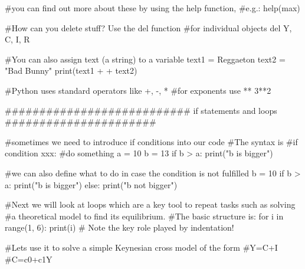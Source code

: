 \documentclass[
  letterpaper,
  DIV=11,
  numbers=noendperiod]{scrreprt}
\newenvironment{Shaded}{\begin{snugshade}}{\end{snugshade}}
\newcommand{\BuiltInTok}[1]{\textcolor[rgb]{0.00,0.23,0.31}{#1}}
\newcommand{\CommentTok}[1]{\textcolor[rgb]{0.37,0.37,0.37}{#1}}
\newcommand{\ControlFlowTok}[1]{\textcolor[rgb]{0.00,0.23,0.31}{#1}}
\newcommand{\DecValTok}[1]{\textcolor[rgb]{0.68,0.00,0.00}{#1}}
\newcommand{\KeywordTok}[1]{\textcolor[rgb]{0.00,0.23,0.31}{#1}}
\newcommand{\NormalTok}[1]{\textcolor[rgb]{0.00,0.23,0.31}{#1}}
\newcommand{\OperatorTok}[1]{\textcolor[rgb]{0.37,0.37,0.37}{#1}}
\newcommand{\StringTok}[1]{\textcolor[rgb]{0.13,0.47,0.30}{#1}}
\begin{document}
\begin{tcolorbox}
\begin{Shaded}
\begin{Highlighting}[]
\CommentTok{\#you can find out more about these by using the help function, }
\CommentTok{\#e.g.: help(max)}

\CommentTok{\#How can you delete stuff? Use the del function}
\CommentTok{\#for individual objects}
\KeywordTok{del}\NormalTok{ Y, C, I, R}

\CommentTok{\#You can also assign text (a string) to a variable}
\NormalTok{text1 }\OperatorTok{=} \StringTok{\textquotesingle{}Reggaeton\textquotesingle{}}
\NormalTok{text2 }\OperatorTok{=} \StringTok{"Bad Bunny"}
\BuiltInTok{print}\NormalTok{(text1 }\OperatorTok{+} \StringTok{\textquotesingle{} \textquotesingle{}} \OperatorTok{+}\NormalTok{ text2)}

\CommentTok{\#Python uses standard operators like +, {-}, *}
\CommentTok{\#for exponents use **}
\DecValTok{3}\OperatorTok{**}\DecValTok{2}

\CommentTok{\#\#\#\#\#\#\#\#\#\#\#\#\#\#\#\#\#\#\#\#\#\#\#\#\#\#\# if statements and loops \#\#\#\#\#\#\#\#\#\#\#\#\#\#\#\#\#\#\#\#\#\#}

\CommentTok{\#sometimes we need to introduce if conditions into our code}
\CommentTok{\#The syntax is}
\CommentTok{\#if condition xxx:}
    \CommentTok{\#do something    }
\NormalTok{a }\OperatorTok{=} \DecValTok{10}
\NormalTok{b }\OperatorTok{=} \DecValTok{13}
\ControlFlowTok{if}\NormalTok{ b }\OperatorTok{\textgreater{}}\NormalTok{ a:}
    \BuiltInTok{print}\NormalTok{(}\StringTok{"b is bigger"}\NormalTok{)}
    
\CommentTok{\#we can also define what to do in case the condition is not fulfilled}
\NormalTok{b }\OperatorTok{=} \DecValTok{10}
\ControlFlowTok{if}\NormalTok{ b }\OperatorTok{\textgreater{}}\NormalTok{ a:}
    \BuiltInTok{print}\NormalTok{(}\StringTok{"b is bigger"}\NormalTok{)}
\ControlFlowTok{else}\NormalTok{:}
    \BuiltInTok{print}\NormalTok{(}\StringTok{"b not bigger"}\NormalTok{)}

\CommentTok{\#Next we will look at loops which are a key tool to repeat tasks such as solving}
\CommentTok{\#a theoretical model to find its equilibrium.}
\CommentTok{\#The basic structure is:}
\ControlFlowTok{for}\NormalTok{ i }\KeywordTok{in} \BuiltInTok{range}\NormalTok{(}\DecValTok{1}\NormalTok{, }\DecValTok{6}\NormalTok{):}
    \BuiltInTok{print}\NormalTok{(i)}
\CommentTok{\# Note the key role played by indentation!}

\CommentTok{\#Let\textquotesingle{}s use it to solve a simple Keynesian cross model of the form}
\CommentTok{\#Y=C+I}
\CommentTok{\#C=c0+c1Y}


\end{Highlighting}
\end{Shaded}
\end{tcolorbox}
\end{document}
